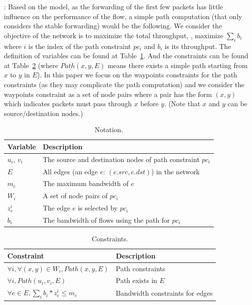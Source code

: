 : Based on the model, as the forwarding of the first few packets has little influence on the performance of the flow, a simple path computation (that only considers the stable forwarding) would be the following. We consider the objective of the network is to maximize the total throughput, \ie, maximize $\sum_ib_i$ where $i$ is the index of the path constraint $pc_i$ and $b_i$ is its throughput. The definition of variables can be found at Table~\ref{table:variables}. And the constraints can be found at Table~\ref{table:constraints} (where $Path(x, y, E)$ means there exists a simple path starting from $x$ to $y$ in $E$). In this paper we focus on the waypoints constraints for the path constraints (as they may complicate the path computation) and we consider the waypoints constraint as a set of node pairs where a pair has the form $(x, y)$ which indicates packets must pass through $x$ before $y$. (Note that $x$ and $y$ can be source/destination nodes.)

\begin{table}[]
\scriptsize
\begin{tabular}{l|l}
Variable     & Description                                                             \\ \hline
$u_i$, $v_i$ & The source and destination nodes of path constraint $pc_i$                            \\ 
$E$          & All edges (an edge $e$: $(e.src, e.dst)$) in the network                       \\
$m_e$        & The maximum bandwidth of $e$                                            \\
$W_i$        & A set of node pairs of $pc_i$ \\
$z^i_e$      & The edge $e$ is selected by $pc_i$ \\
$b_i$          & The bandwidth of flows using the path for $pc_i$                                   
\end{tabular}
\caption{\small Notation.}
\label{table:variables}
\end{table}

\begin{table}[]
\scriptsize
\begin{tabular}{l|l}
Constraint                                        & Description                               \\ \hline
$\forall i, \forall (x, y) \in W_i, Path(x, y, E)$                    & Path constraints                  \\
$\forall i, Path(u_i, v_i, E)$      & Path exists in $E$     \\
$\forall e \in E, \sum_ib_i*z^i_e \le m_e$   & Bandwidth constraints for edges
\end{tabular}
\caption{\small Constraints.}
\label{table:constraints}
\end{table}

